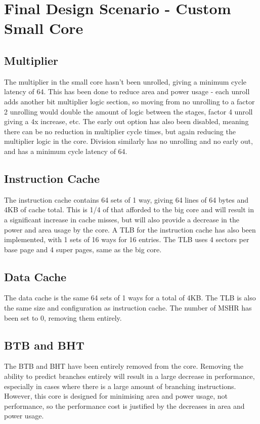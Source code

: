 \section{Final Design Scenario - Custom Small Core}
\subsection{Multiplier} %
The multiplier in the small core hasn't been unrolled, giving a minimum cycle latency of 64. This has been done to reduce area and power usage - each unroll adds another bit multiplier logic section, so moving from no unrolling to a factor 2 unrolling would double the amount of logic between the stages, factor 4 unroll giving a 4x increase, etc. The early out option has also been disabled, meaning there can be no reduction in multiplier cycle times, but again reducing the multiplier logic in the core. Division similarly has no unrolling and no early out, and has a minimum cycle latency of 64.

\subsection{Instruction Cache}
The instruction cache contains 64 sets of 1 way, giving 64 lines of 64 bytes and 4KB of cache total. This is 1/4 of that afforded to the big core and will result in a significant increase in cache misses, but will also provide a decrease in the power and area usage by the core. A TLB for the instruction cache has also been implemented, with 1 sets of 16 ways for 16 entries. The TLB uses 4 sectors per base page and 4 super pages, same as the big core.

\subsection{Data Cache}
The data cache is the same 64 sets of 1 ways for a total of 4KB. The TLB is also the same size and configuration as instruction cache. The number of MSHR has been set to 0, removing them entirely.

\subsection{BTB and BHT}
The BTB and BHT have been entirely removed from the core. Removing the ability to predict branches entirely will result in a large decrease in performance, especially in cases where there is a large amount of branching instructions. However, this core is designed for minimising area and power usage, not performance, so the performance cost is justified by the decreases in area and power usage.

